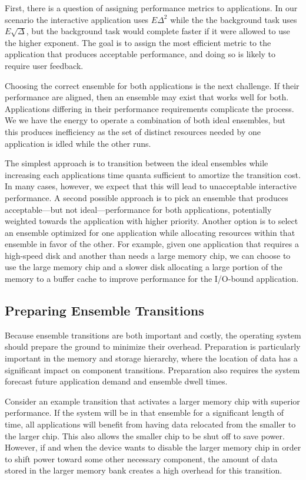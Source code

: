 First, there is a question of assigning performance metrics to applications.
In our scenario the interactive application uses $E\Delta^2$ while the the
background task uses $E\sqrt{\Delta}$, but the background task would complete
faster if it were allowed to use the higher exponent. The goal is to assign
the most efficient metric to the application that produces acceptable
performance, and doing so is likely to require user feedback.

Choosing the correct ensemble for both applications is the next challenge. If
their performance are aligned, then an ensemble may exist that works well for
both. Applications differing in their performance requirements complicate the
process. We we have the energy to operate a combination of both ideal
ensembles, but this produces inefficiency as the set of distinct resources
needed by one application is idled while the other runs.

The simplest approach is to transition between the ideal ensembles while
increasing each applications time quanta sufficient to amortize the
transition cost. In many cases, however, we expect that this will lead to
unacceptable interactive performance. A second possible approach is to pick
an ensemble that produces acceptable---but not ideal---performance for
both applications, potentially weighted towards the application with higher
priority. Another option is to select an ensemble optimized for one
application while allocating resources within that ensemble in favor of the
other. For example, given one application that requires a high-speed disk and
another than needs a large memory chip, we can choose to use the large memory
chip and a slower disk allocating a large portion of the memory to a buffer
cache to improve performance for the I/O-bound application.

\subsection{Preparing Ensemble Transitions}
\label{subsec-prepare}

Because ensemble transitions are both important and costly, the operating
system should prepare the ground to minimize their overhead. Preparation is
particularly important in the memory and storage hierarchy, where the
location of data has a significant impact on component transitions.
Preparation also requires the system forecast future application demand and
ensemble dwell times.

Consider an example transition that activates a larger memory chip with
superior performance. If the system will be in that ensemble for a
significant length of time, all applications will benefit from having data
relocated from the smaller to the larger chip. This also allows the smaller
chip to be shut off to save power. However, if and when the device wants to
disable the larger memory chip in order to shift power toward some other
necessary component, the amount of data stored in the larger memory bank
creates a high overhead for this transition.

